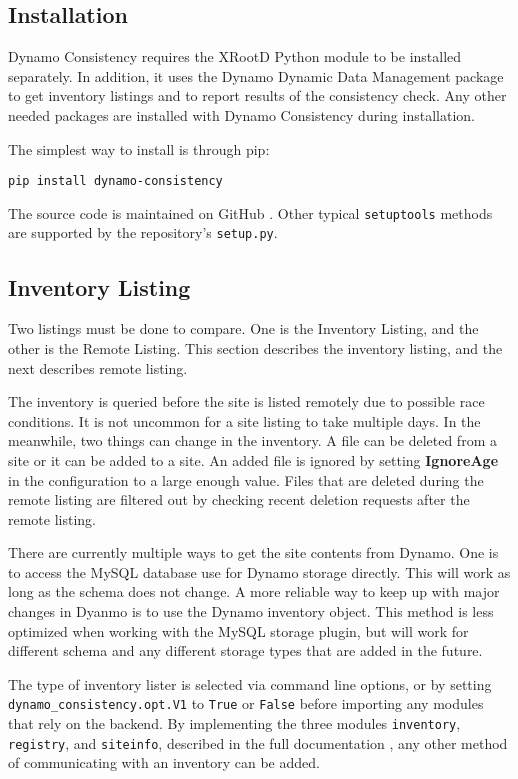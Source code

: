 \subsection{Installation}

Dynamo Consistency requires the XRootD \cite{dorigo2005xrootd}
Python module to be installed separately.
In addition, it uses the Dynamo Dynamic Data Management package to get inventory listings
and to report results of the consistency check.
Any other needed packages are installed with Dynamo Consistency during installation.

The simplest way to install is through pip:

\begin{verbatim}
pip install dynamo-consistency
\end{verbatim}

The source code is maintained on GitHub \cite{dynamo_consistency_src}.
Other typical \texttt{setuptools} methods are supported by
the repository’s \texttt{setup.py}.

\subsection{Inventory Listing}

Two listings must be done to compare.
One is the Inventory Listing,
and the other is the Remote Listing.
This section describes the inventory listing, and the next describes remote listing.

The inventory is queried before the site is listed remotely due to possible race conditions.
It is not uncommon for a site listing to take multiple days.
In the meanwhile, two things can change in the inventory.
A file can be deleted from a site or it can be added to a site.
An added file is ignored by setting {\bf IgnoreAge}
in the configuration to a large enough value.
Files that are deleted during the remote listing
are filtered out by checking recent deletion requests after the remote listing.

There are currently multiple ways to get the site contents from Dynamo.
One is to access the MySQL database use for Dynamo storage directly.
This will work as long as the schema does not change.
A more reliable way to keep up with major changes in Dyanmo
is to use the Dynamo inventory object.
This method is less optimized when working with the MySQL storage plugin,
but will work for different schema and any different storage types
that are added in the future.

The type of inventory lister is selected via command line options,
or by setting \texttt{dynamo\_consistency.opt.V1} to \texttt{True} or \texttt{False}
before importing any modules that rely on the backend.
By implementing the three modules \texttt{inventory}, \texttt{registry},
and \texttt{siteinfo}, described in the full documentation \cite{dynamo-consistency},
any other method of communicating with an inventory can be added.

